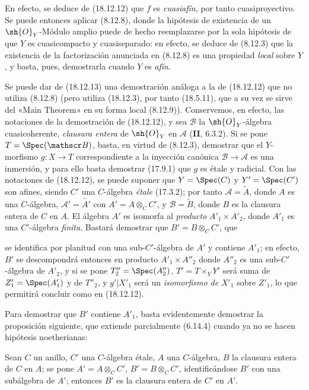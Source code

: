 En efecto, se deduce de (18.12.12) que $f$ es \emph{cuasiafín}, por tanto cuasiproyectivo. Se puede entonces aplicar (8.12.8), donde la hipótesis de existencia de un $\sh{O}_Y$-Módulo amplio puede de hecho reemplazarse por la sola hipótesis de que $Y$ es cuasicompacto y cuasiseparado: en efecto, se deduce de (8.12.3) que la existencia de la factorización anunciada en (8.12.8) es una propiedad \emph{local} sobre $Y$, y basta, pues, demostrarla cuando $Y$ es \emph{afín}.

\begin{remark}[18.12.14]
\label{IV.18.12.14}
Se puede dar de (18.12.13) una demostración análoga a la de (18.12.12) que no utiliza (8.12.8) (pero utiliza (18.12.3), por tanto (18.5.11), que a su vez se sirve del «Main Theorem» en su forma local (8.12.9)). Conservemos, en efecto, las notaciones de la demostración de (18.12.12), y sea $\mathscr B$ la $\sh{O}_Y$-álgebra cuasicoherente, \emph{clausura entera} de $\sh{O}_Y$ en $\mathscr A$ (\textbf{II}, 6.3.2). Si se pone $T=\Spec(\mathscr B)$, basta, en virtud de (8.12.3), demostrar que el $Y$-morfismo $g:X\to T$ correspondiente a la inyección canónica $\mathscr B\to\mathscr A$ es una inmersión, y para ello basta demostrar (17.9.1) que $g$ es étale y radicial. Con las notaciones de (18.12.12), se puede suponer que $Y=\Spec(C)$ y $Y'=\Spec(C')$ son afines, siendo $C'$ una $C$-álgebra \emph{étale} (17.3.2); por tanto $\mathscr A=\widetilde A$, donde $A$ es una $C$-álgebra, $\mathscr A'=\widetilde{A'}$ con $A'=A\otimes_C C'$, y $\mathscr B=\widetilde B$, donde $B$ es la clausura entera de $C$ en $A$. El álgebra $A'$ es isomorfa al \emph{producto} $A'_1\times A'_2$, donde $A'_1$ es una $C'$-álgebra \emph{finita}. Bastará demostrar que $B'=B\otimes_C C'$, que


se identifica por planitud con una sub-$C'$-álgebra de $A'$ y contiene $A'_1$; en efecto, $B'$ se descompondrá entonces en producto $A'_1\times A''_2$ donde $A''_2$ es una sub-$C'$-álgebra de $A'_2$, y si se pone $T''_2=\Spec(A''_2)$, $T'=T\times_Y Y'$ será suma de $Z'_1=\Spec(A'_1)$ y de $T''_2$, y $g'|X'_1$ será un \emph{isomorfismo de} $X'_1$ sobre $Z'_1$, lo que permitirá concluir como en (18.12.12).

Para demostrar que $B'$ contiene $A'_1$, basta evidentemente demostrar la proposición siguiente, que extiende parcialmente (6.14.4) cuando ya no se hacen hipótesis noetherianas:
\end{remark}

\begin{proposition}[18.12.15]
\label{IV.18.12.15}
Sean $C$ un anillo, $C'$ una $C$-álgebra \textup{étale}, $A$ una $C$-álgebra, $B$ la clausura entera de $C$ en $A$; se pone $A'=A\otimes_C C'$, $B'=B\otimes_C C'$, identificándose $B'$ con una subálgebra de $A'$; entonces $B'$ es la clausura entera de $C'$ en $A'$.
\end{proposition}

